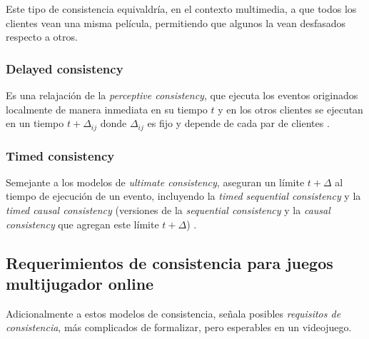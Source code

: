 Este tipo de consistencia equivaldría, en el contexto multimedia, a que todos los clientes vean una misma película, permitiendo que algunos la vean desfasados respecto a otros.

\subsubsection{Delayed consistency}

Es una relajación de la \emph{perceptive consistency}, que ejecuta los eventos originados localmente de manera inmediata en su tiempo $t$ y en los otros clientes se ejecutan en un tiempo $t+\Delta_{ij}$ donde $\Delta_{ij}$ es fijo y depende de cada par de clientes \cite{qin2002delayed}.

\subsubsection{Timed consistency}

Semejante a los modelos de \emph{ultimate consistency}, aseguran un límite $t+\Delta$ al tiempo de ejecución de un evento, incluyendo la \emph{timed sequential consistency} y la \emph{timed causal consistency} (versiones de la \emph{sequential consistency} y la \emph{causal consistency} que agregan este límite $t+\Delta$) \cite{torres1999timed}.

\subsection{Requerimientos de consistencia para juegos multijugador online}

Adicionalmente a estos modelos de consistencia, \cite{palant2006consistency} señala posibles \emph{requisitos de consistencia}, más complicados de formalizar, pero esperables en un videojuego.










